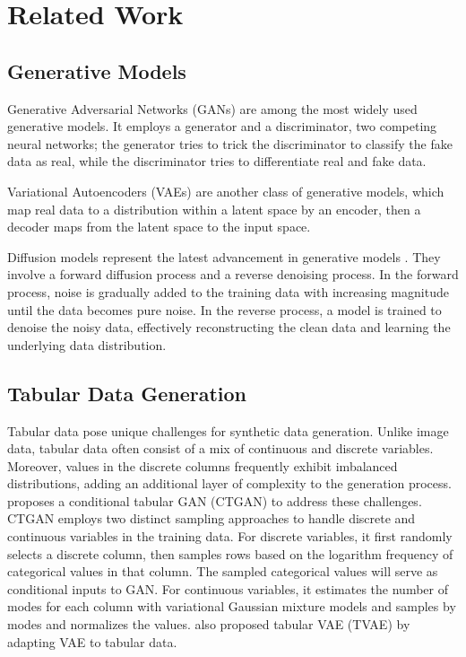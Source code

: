 \section{Related Work}
\label{sec:related}

\subsection{Generative Models} Generative Adversarial Networks (GANs) \cite{GAN} are among the most widely used generative models. It employs a generator and a discriminator, two competing neural networks; the generator tries to trick the discriminator to classify the fake data as real, while the discriminator tries to differentiate real and fake data.

Variational Autoencoders (VAEs) \cite{vae} are another class of generative models, which map real data to a distribution within a latent space by an encoder, then a decoder maps from the latent space to the input space.  

Diffusion models represent the latest advancement in generative models \cite{DDPM
}. They involve a forward diffusion process and a reverse denoising process. In the forward process, noise is gradually added to the training data with increasing magnitude until the data becomes pure noise. In the reverse process, a model is trained to denoise the noisy data, effectively reconstructing the clean data and learning the underlying data distribution.

\subsection{Tabular Data Generation}
Tabular data pose unique challenges for synthetic data generation. Unlike image data, tabular data often consist of a mix of continuous and discrete variables. Moreover, values in the discrete columns frequently exhibit imbalanced distributions, adding an additional layer of complexity to the generation process. \cite{ctgan} proposes a conditional tabular GAN (CTGAN) to address these challenges. CTGAN employs two distinct sampling approaches to handle discrete and continuous variables in the training data. For discrete variables, it first randomly selects a discrete column, then samples rows based on the logarithm frequency of categorical values in that column. The sampled categorical values will serve as conditional inputs to GAN. For continuous variables, it estimates the number of modes for each column with variational Gaussian mixture models \cite{bishop2006pattern} and samples by modes and normalizes the values. \cite{ctgan} also proposed tabular VAE (TVAE) by adapting VAE to tabular data.

